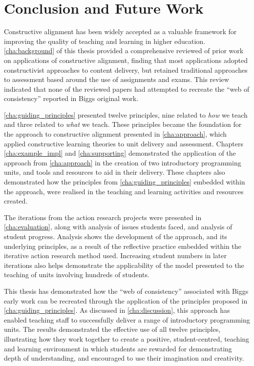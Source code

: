 
\chapter{Conclusion and Future Work} %
\label{cha:conclusion}

Constructive alignment has been widely accepted as a valuable framework for improving the quality of teaching and learning in higher education. \cref{cha:background} of this thesis provided a comprehensive reviewed of prior work on applications of constructive alignment, finding that most applications adopted constructivist approaches to content delivery, but retained traditional approaches to assessment based around the use of assignments and exams. This review indicated that none of the reviewed papers had attempted to recreate the ``web of consistency'' reported in Biggs original work.

\cref{cha:guiding_principles} presented twelve principles, nine related to \emph{how} we teach and three related to \emph{what} we teach. These principles became the foundation for the approach to constructive alignment presented in \cref{cha:approach}, which applied constructive learning theories to unit delivery and assessment. Chapters \ref{cha:example_impl} and \ref{cha:supporting} demonstrated the application of the approach from \cref{cha:approach} in the creation of two introductory programming units, and tools and resources to aid in their delivery. These chapters also demonstrated how the principles from \cref{cha:guiding_principles} embedded within the approach, were realised in the teaching and learning activities and resources created.

The iterations from the action research projects were presented in \cref{cha:evaluation}, along with analysis of issues students faced, and analysis of student progress. Analysis shows the development of the approach, and its underlying principles, as a result of the reflective practice embedded within the iterative action research method used. Increasing student numbers in later iterations also helps demonstrate the applicability of the model presented to the teaching of units involving hundreds of students. 

This thesis has demonstrated how the ``web of consistency'' associated with Biggs early work can be recreated through the application of the principles proposed in \cref{cha:guiding_principles}. As discussed in \cref{cha:discussion}, this approach has enabled teaching staff to successfully deliver a range of introductory programming units. The results demonstrated the effective use of all twelve principles, illustrating how they work together to create a positive, student-centred, teaching and learning environment in which students are rewarded for demonstrating depth of understanding, and encouraged to use their imagination and creativity.

